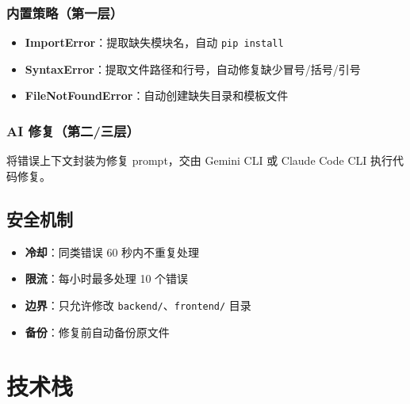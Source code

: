 \documentclass[12pt,a4paper]{ctexart}
\begin{document}
\subsubsection{内置策略（第一层）}
\begin{itemize}[leftmargin=2em]
    \item \textbf{ImportError}：提取缺失模块名，自动 \texttt{pip install}
    \item \textbf{SyntaxError}：提取文件路径和行号，自动修复缺少冒号/括号/引号
    \item \textbf{FileNotFoundError}：自动创建缺失目录和模板文件
\end{itemize}

\subsubsection{AI 修复（第二/三层）}
将错误上下文封装为修复 prompt，交由 Gemini CLI 或 Claude Code CLI 执行代码修复。

\subsection{安全机制}
\begin{itemize}[leftmargin=2em]
    \item \textbf{冷却}：同类错误 60 秒内不重复处理
    \item \textbf{限流}：每小时最多处理 10 个错误
    \item \textbf{边界}：只允许修改 \texttt{backend/}、\texttt{frontend/} 目录
    \item \textbf{备份}：修复前自动备份原文件
\end{itemize}

\section{技术栈}
\end{document}
